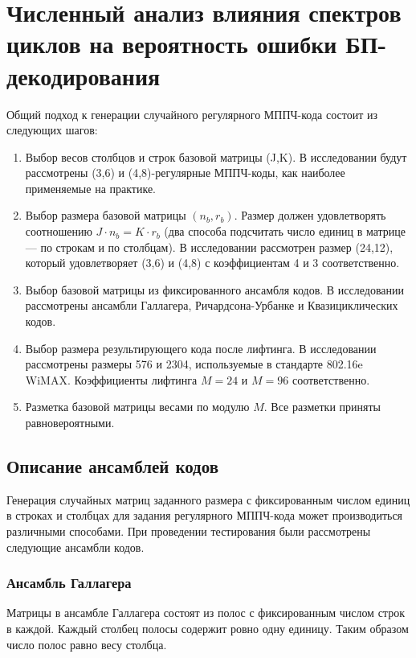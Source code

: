 \chapter{Численный анализ влияния спектров циклов на вероятность ошибки 
БП-декодирования} 

Общий подход к генерации случайного регулярного МППЧ-кода состоит из следующих шагов:
\begin{enumerate}
	\item Выбор весов столбцов и строк базовой матрицы (J,K). В исследовании будут рассмотрены
	(3,6) и (4,8)-регулярные МППЧ-коды, как наиболее применяемые на практике.
	\item Выбор размера базовой матрицы $(n_b,r_b)$. Размер должен удовлетворять соотношению 
	$J \cdot n_b = K \cdot r_b$ (два способа подсчитать число единиц в матрице --- по строкам и по столбцам).
	В исследовании рассмотрен размер (24,12), который удовлетворяет (3,6) и (4,8) с коэффициентам 4 и 3
	соответственно.
	\item Выбор базовой матрицы из фиксированного ансамбля кодов. В исследовании рассмотрены ансамбли
	Галлагера, Ричардсона-Урбанке и Квазициклических кодов.
	\item Выбор размера результирующего кода после лифтинга. В исследовании рассмотрены размеры
	576 и 2304, используемые в стандарте 802.16e WiMAX. Коэффициенты лифтинга $M=24$ и $M=96$
	соответственно.
	\item Разметка базовой матрицы весами по модулю $M$. Все разметки приняты равновероятными.
\end{enumerate}

\section{Описание ансамблей кодов}

Генерация случайных матриц заданного размера с фиксированным числом единиц в строках и столбцах для
задания регулярного МППЧ-кода может производиться различными способами. При проведении
тестирования были рассмотрены следующие ансамбли кодов.

\subsection{Ансамбль Галлагера}

Матрицы в ансамбле Галлагера состоят из полос с фиксированным числом строк в каждой. Каждый столбец
полосы содержит ровно одну единицу. Таким образом число полос равно весу столбца.

